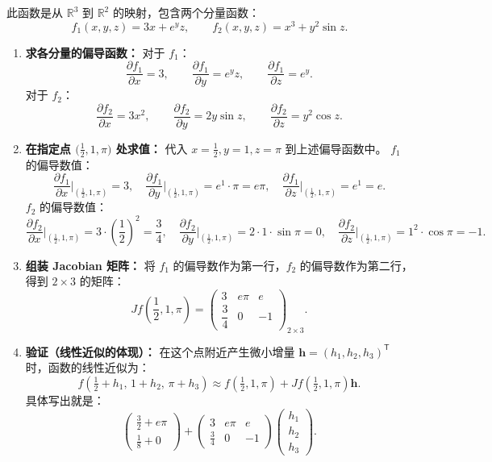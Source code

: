 \documentclass[lang=cn,11pt]{elegantbook}
\begin{document}
\begin{solution}
此函数是从 $\mathbb R^3$ 到 $\mathbb R^2$ 的映射，包含两个分量函数：
\[ f_1(x,y,z)=3x+e^yz,\qquad f_2(x,y,z)=x^3+y^2\sin z. \]

\begin{enumerate}
  \item \textbf{求各分量的偏导函数：}
  对于 $f_1$：
  \[
  \frac{\partial f_1}{\partial x}=3,\qquad
  \frac{\partial f_1}{\partial y}=e^y z,\qquad
  \frac{\partial f_1}{\partial z}=e^y.
  \]
  对于 $f_2$：
  \[
  \frac{\partial f_2}{\partial x}=3x^2,\qquad
  \frac{\partial f_2}{\partial y}=2y\sin z,\qquad
  \frac{\partial f_2}{\partial z}=y^2\cos z.
  \]

  \item \textbf{在指定点 $\bigl(\frac12,1,\pi\bigr)$ 处求值：}
  代入 $x=\frac12, y=1, z=\pi$ 到上述偏导函数中。
  $f_1$ 的偏导数值：
  \[
  \frac{\partial f_1}{\partial x}\biggr|_{(\frac12,1,\pi)}=3,\quad
  \frac{\partial f_1}{\partial y}\biggr|_{(\frac12,1,\pi)}=e^1\cdot\pi=e\pi,\quad
  \frac{\partial f_1}{\partial z}\biggr|_{(\frac12,1,\pi)}=e^1=e.
  \]
  $f_2$ 的偏导数值：
  \[
  \frac{\partial f_2}{\partial x}\biggr|_{(\frac12,1,\pi)}
  =3\cdot\left(\frac12\right)^2=\frac34,\quad
  \frac{\partial f_2}{\partial y}\biggr|_{(\frac12,1,\pi)}
  =2\cdot 1\cdot\sin\pi=0,\quad
  \frac{\partial f_2}{\partial z}\biggr|_{(\frac12,1,\pi)}
  =1^2\cdot\cos\pi=-1.
  \]

  \item \textbf{组装 Jacobian 矩阵：}
  将 $f_1$ 的偏导数作为第一行，$f_2$ 的偏导数作为第二行，得到 $2 \times 3$ 的矩阵：
  \[
  \boxed{Jf\!\left(\frac12,1,\pi\right)
  =\begin{pmatrix}
  3 & e\pi & e\\[6pt]
  \dfrac34 & 0 & -1
  \end{pmatrix}_{2\times 3}}.
  \]

  \item \textbf{验证（线性近似的体现）：}
  在这个点附近产生微小增量 $\boldsymbol h = (h_1, h_2, h_3)^{\mathsf T}$ 时，函数的线性近似为：
  \[
  f\!\left(\tfrac12+h_1,\,1+h_2,\,\pi+h_3\right)
  \approx f\!\left(\tfrac12,1,\pi\right)+Jf\!\left(\tfrac12,1,\pi\right)\boldsymbol h.
  \]
  具体写出就是：
  \[
  \begin{pmatrix}
  \frac32+e\pi\\
  \frac18+0
  \end{pmatrix}
  +\begin{pmatrix}
  3 & e\pi & e\\[6pt]
  \frac34 & 0 & -1
  \end{pmatrix}
  \begin{pmatrix}
  h_1\\h_2\\h_3
  \end{pmatrix}.
  \]
\end{enumerate}
\end{solution}
\end{document}
